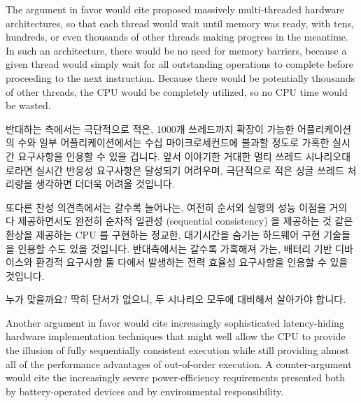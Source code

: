 The argument in favor would cite proposed massively multi-threaded hardware
architectures, so that each thread would wait until memory was ready,
with tens, hundreds, or even thousands of other threads making progress
in the meantime.
In such an architecture, there would be no need for memory barriers,
because a given thread would simply wait for all outstanding operations
to complete before proceeding to the next instruction.
Because there would be potentially thousands of other threads, the
CPU would be completely utilized, so no CPU time would be wasted.
\fi

반대하는 측에서는 극단적으로 적은, 1000개 쓰레드까지 확장이 가능한
어플리케이션의 수와 일부 어플리케이션에서는 수십 마이크로세컨드에 불과할 정도로
가혹한 실시간 요구사항을 인용할 수 있을 겁니다.
앞서 이야기한 거대한 멀티 쓰레드 시나리오대로라면 실시간 반응성 요구사항은
달성되기 어려우며, 극단적으로 적은 싱글 쓰레드 처리량을 생각하면 더더욱 어려울
것입니다.
\iffalse

The argument against would cite the extremely limited number of applications
capable of scaling up to a thousand threads, as well as increasingly
severe realtime requirements, which are in the tens of microseconds
for some applications.
The realtime-response requirements are difficult enough to meet as is,
and would be even more difficult to meet given the extremely low
single-threaded throughput implied by the massive multi-threaded
scenarios.
\fi

또다른 찬성 의견측에서는 갈수록 늘어나는, 여전히 순서외 실행의 성능 이점을 거의
다 제공하면서도 완전히 순차적 일관성 (sequential consistency) 을 제공하는 것
같은 환상을 제공하는 CPU 를 구현하는 정교한, 대기시간을 숨기는 하드웨어 구현
기술들을 인용할 수도 있을 것입니다.
반대측에서는 갈수록 가혹해져 가는, 배터리 기반 디바이스와 환경적 요구사항 둘
다에서 발생하는 전력 효율성 요구사항을 인용할 수 있을 것입니다.

누가 맞을까요?
딱히 단서가 없으니, 두 시나리오 모두에 대비해서 살아가야 합니다.
\iffalse

Another argument in favor would cite increasingly sophisticated
latency-hiding hardware implementation techniques that might well allow
the CPU to provide the illusion of fully sequentially consistent
execution while still providing almost all of the performance advantages
of out-of-order execution.
A counter-argument would cite the increasingly severe power-efficiency
requirements presented both by battery-operated devices and by
environmental responsibility.

